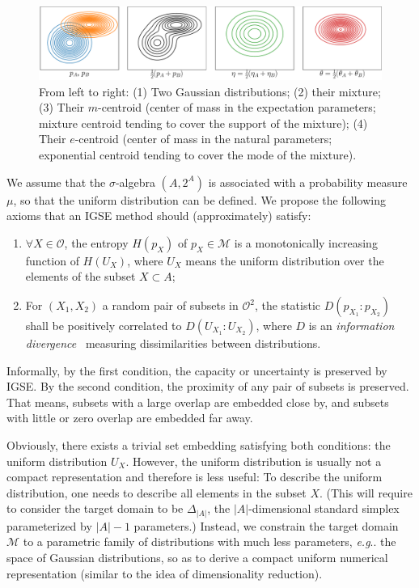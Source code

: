 \documentclass{article}
\makeatletter
\DeclareRobustCommand\onedot{\futurelet\@let@token\bmv@onedotaux}
\def\bmv@onedotaux{\ifx\@let@token.\else.\null\fi\xspace}
\def\eg{\emph{e.g}\onedot} \def\Eg{\emph{E.g}\onedot}
\makeatother
\begin{document}
\begin{figure}[b]
\includegraphics[width=\textwidth]{operation}
\caption{From left to right: (1) Two Gaussian distributions; (2) their mixture;
(3) Their $m$-centroid (center of mass in the expectation parameters; mixture centroid tending to cover the support of the mixture);
(4) Their $e$-centroid  (center of mass in the natural parameters; exponential centroid tending to cover the mode of the mixture).}\label{fig:operation}
\end{figure}

We assume that the $\sigma$-algebra $(A,2^A)$ is associated with a probability measure $\mu$, so that
the uniform distribution can be defined.
We propose the following axioms that an IGSE method should (approximately) satisfy:

\begin{enumerate}
\item[\ding{192}] $\forall{X}\in\mathcal{O}$, the entropy $H(p_X)$ of $p_X\in\mathcal{M}$ is a monotonically increasing function of
$H(U_X)$, where $U_{X}$ means the uniform distribution over the elements of the subset $X\subset{A}$;

\item[\ding{193}] For $(X_1,X_2)$  a random pair of subsets in $\mathcal{O}^2$,
the statistic $D(p_{X_1} : p_{X_2})$ shall be positively correlated to
$D(U_{X_1} : U_{X_2})$, where $D$ is an {\em information divergence}~\cite{aIGI}
measuring dissimilarities between distributions.
\end{enumerate}

Informally, by the first condition, the capacity or uncertainty is preserved by IGSE.
By the second condition, the proximity of any pair of subsets is preserved.
That means, subsets with a large overlap are embedded close by, and subsets with
little or zero overlap are embedded far away.

Obviously, there exists a trivial set embedding satisfying both conditions:
the uniform distribution $U_X$. However, the uniform distribution is usually
not a compact representation and therefore is less useful: To describe the
uniform distribution, one needs to describe all elements in the subset $X$.
(This will require to consider the target domain to be $\Delta_{|A|}$,
the $|A|$-dimensional standard simplex parameterized by $\vert{A}\vert-1$ parameters.)
Instead, we constrain the target domain $\mathcal{M}$ to a parametric family of distributions with much less parameters,
\eg the space of Gaussian distributions, so as to derive a compact uniform
numerical representation (similar to the idea of dimensionality reduction).
\end{document}
